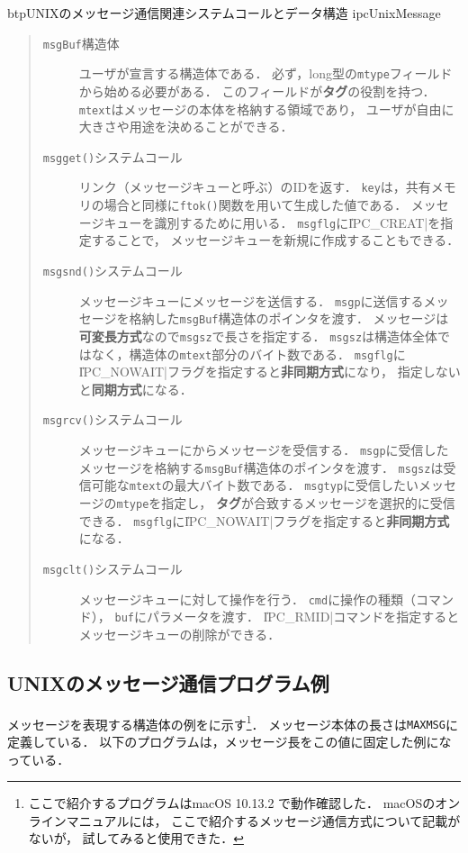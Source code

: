 \begin{myfig}{btp}{UNIXのメッセージ通信関連システムコールとデータ構造}
{ipcUnixMessage}

\end{myfig}

\begin{quote}
\begin{description}
\item [{\tt msgBuf}構造体]
ユーザが宣言する構造体である．
必ず，long型の{\tt mtype}フィールドから始める必要がある．
このフィールドが{\bf タグ}の役割を持つ．
{\tt mtext}はメッセージの本体を格納する領域であり，
ユーザが自由に大きさや用途を決めることができる．

\item [{\tt msgget()}システムコール]
リンク（メッセージキューと呼ぶ）のIDを返す．
{\tt key}は，共有メモリの場合と同様に{\tt ftok()}関数を用いて生成した値である．
メッセージキューを識別するために用いる．
{\tt msgflg}に\|IPC_CREAT|を指定することで，
メッセージキューを新規に作成することもできる．

\item [{\tt msgsnd()}システムコール]
メッセージキューにメッセージを送信する．
{\tt msgp}に送信するメッセージを格納した{\tt msgBuf}構造体のポインタを渡す．
メッセージは{\bf 可変長方式}なので{\tt msgsz}で長さを指定する．
{\tt msgsz}は構造体全体ではなく，構造体の{\tt mtext}部分のバイト数である．
{\tt msgflg}に\|IPC_NOWAIT|フラグを指定すると{\bf 非同期方式}になり，
指定しないと{\bf 同期方式}になる．

\item [{\tt msgrcv()}システムコール]
メッセージキューにからメッセージを受信する．
{\tt msgp}に受信したメッセージを格納する{\tt msgBuf}構造体のポインタを渡す．
{\tt msgsz}は受信可能な{\tt mtext}の最大バイト数である．
{\tt msgtyp}に受信したいメッセージの{\tt mtype}を指定し，
{\bf タグ}が合致するメッセージを選択的に受信できる．
{\tt msgflg}に\|IPC_NOWAIT|フラグを指定すると{\bf 非同期方式}になる．

\item [{\tt msgclt()}システムコール]
メッセージキューに対して操作を行う．
{\tt cmd}に操作の種類（コマンド），
{\tt buf}にパラメータを渡す．
\|IPC_RMID|コマンドを指定するとメッセージキューの削除ができる．
\end{description}
\end{quote}

\subsection{UNIXのメッセージ通信プログラム例}
メッセージを表現する構造体の例をに示す\footnote{
ここで紹介するプログラムはmacOS 10.13.2 で動作確認した．
macOSのオンラインマニュアルには，
ここで紹介するメッセージ通信方式について記載がないが，
試してみると使用できた．}．
メッセージ本体の長さは{\tt MAXMSG}に定義している．
以下のプログラムは，メッセージ長をこの値に固定した例になっている．

